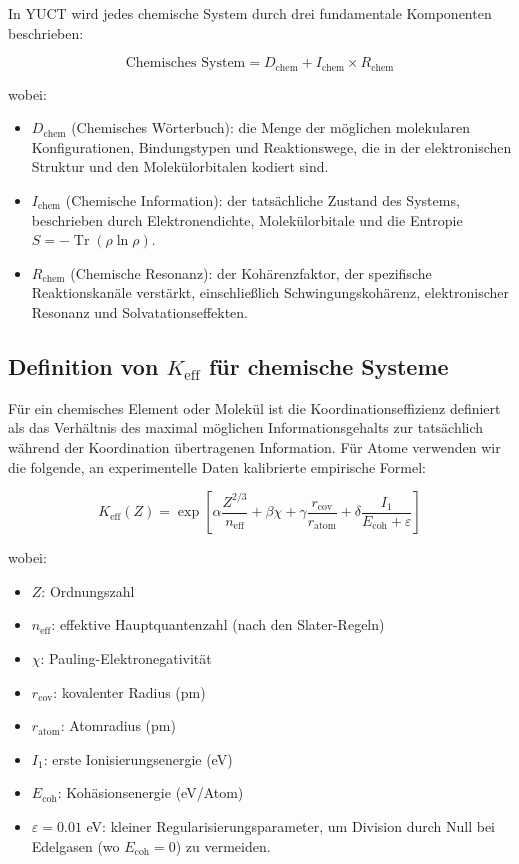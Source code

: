 \documentclass[12pt,a4paper]{article}
\newcommand{\Keff}{K_{\mathrm{eff}}}
\DeclareMathOperator{\Tr}{Tr}
\begin{document}
	In YUCT wird jedes chemische System durch drei fundamentale Komponenten beschrieben:
	
	\begin{equation}
		\text{Chemisches System} = D_{\text{chem}} + I_{\text{chem}} \times R_{\text{chem}}
		\label{eq:chem-triad}
	\end{equation}
	
	wobei:
	\begin{itemize}
		\item $D_{\text{chem}}$ (Chemisches Wörterbuch): die Menge der möglichen molekularen Konfigurationen, Bindungstypen und Reaktionswege, die in der elektronischen Struktur und den Molekülorbitalen kodiert sind.
		\item $I_{\text{chem}}$ (Chemische Information): der tatsächliche Zustand des Systems, beschrieben durch Elektronendichte, Molekülorbitale und die Entropie $S = -\Tr(\rho \ln \rho)$.
		\item $R_{\text{chem}}$ (Chemische Resonanz): der Kohärenzfaktor, der spezifische Reaktionskanäle verstärkt, einschließlich Schwingungskohärenz, elektronischer Resonanz und Solvatationseffekten.
	\end{itemize}
	
	\subsection{Definition von $\Keff$ für chemische Systeme}
	
	Für ein chemisches Element oder Molekül ist die Koordinationseffizienz definiert als das Verhältnis des maximal möglichen Informationsgehalts zur tatsächlich während der Koordination übertragenen Information. Für Atome verwenden wir die folgende, an experimentelle Daten kalibrierte empirische Formel:
	
	\begin{equation}
		\Keff(Z) = \exp\left[\alpha \frac{Z^{2/3}}{n_{\text{eff}}} + \beta \chi + \gamma \frac{r_{\text{cov}}}{r_{\text{atom}}} + \delta \frac{I_1}{E_{\text{coh}} + \varepsilon}\right]
		\label{eq:keff-element}
	\end{equation}
	
	wobei:
	\begin{itemize}
		\item $Z$: Ordnungszahl
		\item $n_{\text{eff}}$: effektive Hauptquantenzahl (nach den Slater-Regeln)
		\item $\chi$: Pauling-Elektronegativität
		\item $r_{\text{cov}}$: kovalenter Radius (pm)
		\item $r_{\text{atom}}$: Atomradius (pm)
		\item $I_1$: erste Ionisierungsenergie (eV)
		\item $E_{\text{coh}}$: Kohäsionsenergie (eV/Atom)
		\item $\varepsilon = 0.01$ eV: kleiner Regularisierungsparameter, um Division durch Null bei Edelgasen (wo $E_{\text{coh}} = 0$) zu vermeiden.
	\end{itemize}
	
\end{document}
